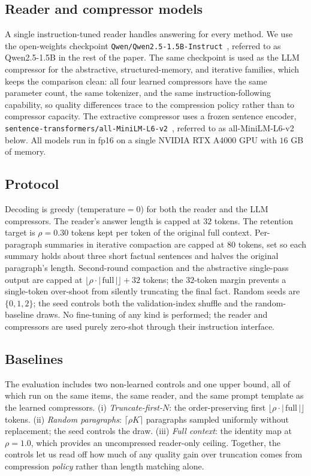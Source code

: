 \documentclass[10pt,twocolumn]{article}
\begin{document}
\subsection{Reader and compressor models}
A single instruction-tuned reader handles answering for every method. We use the open-weights checkpoint \texttt{Qwen/Qwen2.5-1.5B-Instruct}~\cite{qwen2024qwen2_5}, referred to as Qwen2.5-1.5B in the rest of the paper. The same checkpoint is used as the LLM compressor for the abstractive, structured-memory, and iterative families, which keeps the comparison clean: all four learned compressors have the same parameter count, the same tokenizer, and the same instruction-following capability, so quality differences trace to the compression policy rather than to compressor capacity. The extractive compressor uses a frozen sentence encoder, \texttt{sentence-transformers/all-MiniLM-L6-v2}~\cite{reimers2019sbert}, referred to as all-MiniLM-L6-v2 below. All models run in fp16 on a single NVIDIA RTX A4000 GPU with $16$ GB of memory.

\subsection{Protocol}
Decoding is greedy ($\mathrm{temperature}=0$) for both the reader and the LLM compressors. The reader's answer length is capped at $32$ tokens. The retention target is $\rho = 0.30$ tokens kept per token of the original full context. Per-paragraph summaries in iterative compaction are capped at $80$ tokens, set so each summary holds about three short factual sentences and halves the original paragraph's length. Second-round compaction and the abstractive single-pass output are capped at $\lfloor \rho \cdot |\,\text{full}\,| \rfloor + 32$ tokens; the $32$-token margin prevents a single-token over-shoot from silently truncating the final fact. Random seeds are $\{0, 1, 2\}$; the seed controls both the validation-index shuffle and the random-baseline draws. No fine-tuning of any kind is performed; the reader and compressors are used purely zero-shot through their instruction interface.

\subsection{Baselines}
The evaluation includes two non-learned controls and one upper bound, all of which run on the same items, the same reader, and the same prompt template as the learned compressors. (i) \emph{Truncate-first-$N$}: the order-preserving first $\lfloor \rho \cdot |\,\text{full}\,| \rfloor$ tokens. (ii) \emph{Random paragraphs}: $\lceil \rho K \rceil$ paragraphs sampled uniformly without replacement; the seed controls the draw. (iii) \emph{Full context}: the identity map at $\rho = 1.0$, which provides an uncompressed reader-only ceiling. Together, the controls let us read off how much of any quality gain over truncation comes from compression \emph{policy} rather than length matching alone.
\end{document}
